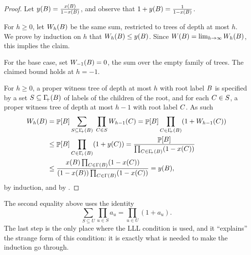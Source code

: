 \begin{proof}
    Let $y({B}) = \frac{x({B})}{1 - x({B})}$, and observe
    that $1 + y({B}) = \frac{1}{1 - x({B})}$.

    For $h \geq 0$, let $W_h({B})$ be the same sum, restricted
    to trees of depth at most $h$. We prove by induction on $h$ that
    $W_h({B}) \leq y({B})$. Since $W({B}) =
    \lim_{h \to \infty} W_h({B})$, this implies the claim.

    For the base case, set $W_{-1}({B})=0$, the sum over
    the empty family of trees. The claimed bound holds at $h=-1$.

    For $h \geq 0$, a proper witness tree of depth at most $h$ with root
    label ${B}$ is specified by a set
    $S \subseteq \NbrCX{\BEvent}$ of labels of the children of the root,
    and for each ${C} \in S$, a proper witness tree of depth at
    most $h-1$ with root label ${C}$. As such
    \begin{align*}
        \WSum_h(\BEvent)%
        &=%
        \Prob{\BEvent} \sum_{S \subseteq \NbrCX{\BEvent}} \;
        \prod_{\BEventA \in S} \WSum_{h-1}(\BEventA)%
        =%
        \Prob{\BEvent} \prod_{\BEventA \in \NbrCX{\BEvent}} \pth{1 +
           \WSum_{h-1}(\BEventA)}%
        \\&%
        \leq%
        \Prob{\BEvent} \prod_{\BEventA \in \NbrCX{\BEvent}} \pth{1 +
           y(\BEventA)}%
        =%
        \frac{\Prob{\BEvent}}{\prod_{\BEventA \in \NbrCX{\BEvent}} \pth{1 -
              x(\BEventA)}}%
        \\&%
        \leq%
        \frac{x(\BEvent) \prod_{\BEventA \in \NbrX{\BEvent}} \pth{1 -
              x(\BEventA)}}{\pth{1 - x(\BEvent)} \prod_{\BEventA \in
              \NbrX{\BEvent}} \pth{1 - x(\BEventA)}}%
        =%
        y(\BEvent),
    \end{align*}
    by induction, and by .
\end{proof}

\begin{remark}
    The second equality above uses the identity
    \begin{equation*}
        \sum_{S \subseteq U} \prod_{u \in S} a_u = \prod_{u \in U} (1 +
        a_u).
    \end{equation*}
    The last step is the only place where the LLL condition
     is used, and it ``explains'' the strange form
    of this condition: it is exactly what is needed to make the
    induction go through.
\end{remark}

